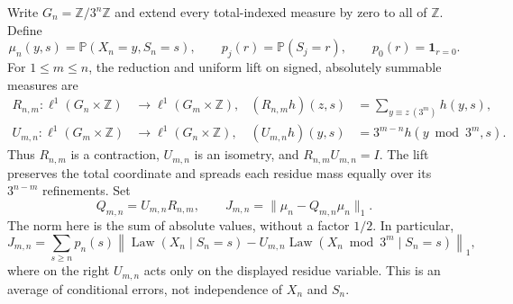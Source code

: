 \documentclass[11pt]{article}
\theoremstyle{remark}\newtheorem{remark}[proposition]{Remark}
\newcommand{\PP}{\mathbb P}
\newcommand{\ZZ}{\mathbb Z}
\newcommand{\one}{\mathbf 1}
\begin{document}
Write $G_n=\ZZ/3^n\ZZ$ and extend every total-indexed measure by zero to
all of $\ZZ$. Define
\[
 \mu_n(y,s)=\PP(X_n=y,S_n=s),\qquad
 p_j(r)=\PP(S_j=r),\qquad p_0(r)=\one_{r=0}.
\]
For $1\le m\le n$, the reduction and uniform lift on signed, absolutely
summable measures are
\begin{align*}
 R_{n,m}:\ell^1(G_n\times\ZZ)&\longrightarrow\ell^1(G_m\times\ZZ),&
 (R_{n,m}h)(z,s)&=\sum_{y\equiv z\ (3^m)}h(y,s),\\
 U_{m,n}:\ell^1(G_m\times\ZZ)&\longrightarrow\ell^1(G_n\times\ZZ),&
 (U_{m,n}h)(y,s)&=3^{m-n}h(y\bmod3^m,s).
\end{align*}
Thus $R_{n,m}$ is a contraction, $U_{m,n}$ is an isometry, and
$R_{n,m}U_{m,n}=I$. The lift preserves the total coordinate and spreads
each residue mass equally over its $3^{n-m}$ refinements. Set
\[
 Q_{m,n}=U_{m,n}R_{n,m},\qquad
 J_{m,n}=\|\mu_n-Q_{m,n}\mu_n\|_1.
\]
The norm here is the sum of absolute values, without a factor $1/2$.
In particular,
\begin{equation}\label{eq:joint-conditional-identity}
 J_{m,n}=\sum_{s\ge n}p_n(s)
 \left\|\operatorname{Law}(X_n\mid S_n=s)
       -U_{m,n}\operatorname{Law}(X_n\bmod3^m\mid S_n=s)\right\|_1,
\end{equation}
where on the right $U_{m,n}$ acts only on the displayed residue variable.
This is an average of conditional errors, not independence of $X_n$ and
$S_n$.
\end{document}
